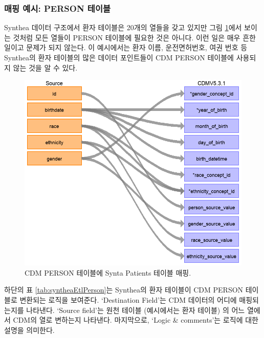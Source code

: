 \documentclass[11pt]{book}
\theoremstyle{definition}
\theoremstyle{definition}
\theoremstyle{definition}
\theoremstyle{remark}
\begin{document}
\subsubsection*{매핑 예시: PERSON 테이블}\label{--person-}

Synthea 데이터 구조에서 환자 테이블은 20개의 열들을 갖고 있지만 그림
\ref{fig:syntheaPerson}에서 보이는 것처럼 모든 열들이 PERSON 테이블에
필요한 것은 아니다. 이런 일은 매우 흔한 일이고 문제가 되지 않는다. 이
예시에서는 환자 이름, 운전면허번호, 여권 번호 등 Synthea의 환자 테이블의
많은 데이터 포인트들이 CDM PERSON 테이블에 사용되지 않는 것을 알 수
있다.

\begin{figure}

{\centering \includegraphics[width=1\linewidth]{images/ExtractTransformLoad/syntheaPersonTable} 

}

\caption{CDM PERSON 테이블에 Synta Patients 테이블 매핑.}\label{fig:syntheaPerson}
\end{figure}

하단의 표 \ref{tab:syntheaEtlPerson}는 Synthea의 환자 테이블이 CDM
PERSON 테이블로 변환되는 로직을 보여준다. `Destination Field'는 CDM
데이터의 어디에 매핑되는지를 나타낸다. `Source field'는 원천 테이블
(예시에서는 환자 테이블) 의 어느 열에서 CDM의 열로 변하는지 나타낸다.
마지막으로, `Logic \& comments'는 로직에 대한 설명을 의미한다.
\end{document}
